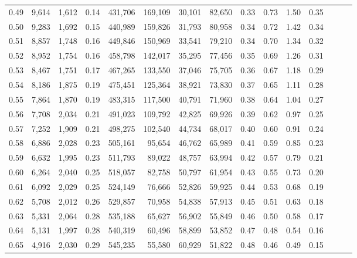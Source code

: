 \begin{tabular}{rrrrrrrrrrrrrrr}
0.49 &   9,614 &  1,612 &  0.14 &  431,706 &  169,109 &   30,101 &   82,650 &  0.33 &  0.73 &  1.50 &      0.35 \\
0.50 &   9,283 &  1,692 &  0.15 &  440,989 &  159,826 &   31,793 &   80,958 &  0.34 &  0.72 &  1.42 &      0.34 \\
0.51 &   8,857 &  1,748 &  0.16 &  449,846 &  150,969 &   33,541 &   79,210 &  0.34 &  0.70 &  1.34 &      0.32 \\
0.52 &   8,952 &  1,754 &  0.16 &  458,798 &  142,017 &   35,295 &   77,456 &  0.35 &  0.69 &  1.26 &      0.31 \\
0.53 &   8,467 &  1,751 &  0.17 &  467,265 &  133,550 &   37,046 &   75,705 &  0.36 &  0.67 &  1.18 &      0.29 \\
0.54 &   8,186 &  1,875 &  0.19 &  475,451 &  125,364 &   38,921 &   73,830 &  0.37 &  0.65 &  1.11 &      0.28 \\
0.55 &   7,864 &  1,870 &  0.19 &  483,315 &  117,500 &   40,791 &   71,960 &  0.38 &  0.64 &  1.04 &      0.27 \\
0.56 &   7,708 &  2,034 &  0.21 &  491,023 &  109,792 &   42,825 &   69,926 &  0.39 &  0.62 &  0.97 &      0.25 \\
0.57 &   7,252 &  1,909 &  0.21 &  498,275 &  102,540 &   44,734 &   68,017 &  0.40 &  0.60 &  0.91 &      0.24 \\
0.58 &   6,886 &  2,028 &  0.23 &  505,161 &   95,654 &   46,762 &   65,989 &  0.41 &  0.59 &  0.85 &      0.23 \\
0.59 &   6,632 &  1,995 &  0.23 &  511,793 &   89,022 &   48,757 &   63,994 &  0.42 &  0.57 &  0.79 &      0.21 \\
0.60 &   6,264 &  2,040 &  0.25 &  518,057 &   82,758 &   50,797 &   61,954 &  0.43 &  0.55 &  0.73 &      0.20 \\
0.61 &   6,092 &  2,029 &  0.25 &  524,149 &   76,666 &   52,826 &   59,925 &  0.44 &  0.53 &  0.68 &      0.19 \\
0.62 &   5,708 &  2,012 &  0.26 &  529,857 &   70,958 &   54,838 &   57,913 &  0.45 &  0.51 &  0.63 &      0.18 \\
0.63 &   5,331 &  2,064 &  0.28 &  535,188 &   65,627 &   56,902 &   55,849 &  0.46 &  0.50 &  0.58 &      0.17 \\
0.64 &   5,131 &  1,997 &  0.28 &  540,319 &   60,496 &   58,899 &   53,852 &  0.47 &  0.48 &  0.54 &      0.16 \\
0.65 &   4,916 &  2,030 &  0.29 &  545,235 &   55,580 &   60,929 &   51,822 &  0.48 &  0.46 &  0.49 &      0.15 \\

\end{tabular}
